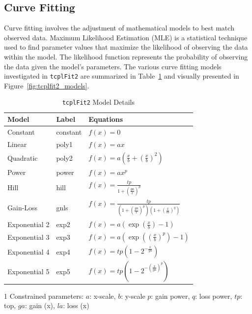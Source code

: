 \subsection{Curve Fitting}
Curve fitting involves the adjustment of mathematical models to best match observed data. Maximum Likelihood Estimation (MLE) is a statistical technique used to find parameter values that maximize the likelihood of observing the data within the model. The likelihood function represents the probability of observing the data given the model's parameters. The various curve fitting models investigated in \texttt{tcplFit2} are summarized in Table~\ref{tab:tcplfit2_models} and visually presented in Figure~\ref{fig:tcplfit2_models}.

\begin{table}
    \centering
    \begin{threeparttable}[b]
    \caption{\texttt{tcplFit2} Model Details}
    \begin{tabular}{lll}
    \toprule
    \textbf{Model} & \textbf{Label} & \textbf{Equations\tnote{1}} \\
    \midrule
    Constant & constant & \(f(x) = 0\) \\ 
    Linear & poly1 & \(f(x) = ax\) \\ 
    Quadratic & poly2 & \(f(x) = a\left(\frac{x}{b} + {\left(\frac{x}{b}\right)}^{2}\right)\) \\ 
    Power & power & \(f(x) = ax^p\) \\ 
    Hill & hill & \(f(x) = \frac{tp}{1 + {\left(\frac{ga}{x}\right)}^{p}}\) \\ 
    Gain-Loss & gnls & \(f(x) = \frac{tp}{(1 + {\left(\frac{ga}{x}\right)}^{p})(1 + {\left(\frac{x}{la}\right)}^{q})}\) \\ 
    Exponential 2 & exp2 & \(f(x) = a\left(\exp\left(\frac{x}{b}\right) - 1\right)\) \\
    Exponential 3 & exp3 & \(f(x) = a\left(\exp\left({\left(\frac{x}{b}\right)}^{p}\right) - 1\right)\) \\
    Exponential 4 & exp4 & \(f(x) = tp\left(1 - 2^{-\frac{x}{ga}}\right)\) \\
    Exponential 5 & exp5 & \(f(x) = tp{\left(1 - 2^{-(\frac{x}{ga})^{p}}\right)}\) \\
    \bottomrule
    \end{tabular}
    \begin{tablenotes}
        \item [1] Constrained parameters: $a$: x-scale, $b$: y-scale $p$: gain power, $q$: loss power, $tp$: top, $ga$: gain (x), $la$: loss (x)
    \end{tablenotes}
~\label{tab:tcplfit2_models}
\end{threeparttable}
\end{table}

